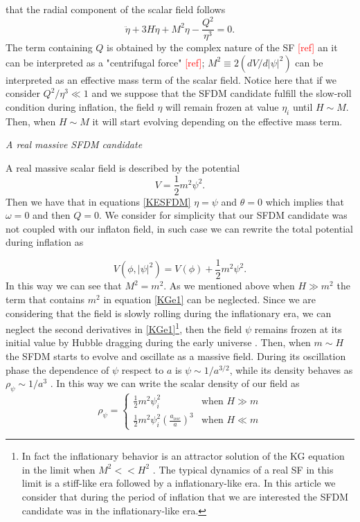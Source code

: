\documentclass[amssymb,twocolumn,prd,nofootinbib,showpacs]{revtex4-1}
\begin{document}
that the radial component of the scalar field follows
\begin{equation}\label{KGe3}
\ddot\eta+3H\dot\eta+M^2\eta-\frac{Q^2}{\eta^3}= 0.
\end{equation}
The term containing $Q$ is obtained by the complex nature of the SF \textcolor{red}{[ref]} an it can be interpreted as a "centrifugal force" \textcolor{red}{[ref]}; $M^2\equiv 2(dV/d|\psi|^2)$ can be interpreted as an effective mass term of the scalar field. Notice here that if we consider $Q^2/\eta^3\ll 1$ and we suppose that the SFDM candidate fulfill the slow-roll condition during inflation, the field $\eta$ will remain frozen at value $\eta_i$ until $H\sim M$. Then, when $H\sim M$ it will start evolving depending on the effective mass term.
\begin{center}
\textit{A real massive SFDM candidate}
\end{center}

A real massive scalar field is described by the potential 
\begin{equation}
V = \frac{1}{2}m^2\psi^2.
\end{equation}
Then we have that in equations \eqref{KESFDM} $\eta=\psi$ and $\theta=0$ which implies that $\omega=0$ and then $Q = 0$. We consider for simplicity that our SFDM candidate was not coupled with our inflaton field, in such case we can rewrite the total potential during inflation as

\begin{equation}\label{potential_massive}
V(\phi,|\psi|^2)=V(\phi)+\frac{1}{2}m^2\psi^2.
\end{equation}
In this way we can see that $M^2=m^2$. As we mentioned above when $H\gg m^2$ the term that contains $m^2$ in equation \eqref{KGe1} can be neglected. Since we are considering that the field is slowly rolling during the inflationary era, we can neglect the second derivatives in \eqref{KGe1}\footnote{In fact the inflationary behavior is an attractor solution of the KG equation in the limit when $M^2<<H^2$ \cite{atractorinf1,atractorinf2}. The typical dynamics of a real SF in this limit is a stiff-like era followed by a inflationary-like era. In this article we consider that during the period of inflation that we are interested the SFDM candidate was in the inflationary-like era.}, then the field $\psi$ remains frozen at its initial value by Hubble dragging during the early universe \cite{curvatonatractor}. Then, when $m\sim H$ the SFDM starts to evolve and oscillate as a massive field. During its oscillation phase the dependence of $\psi$ respect to $a$ is $\psi\sim 1/a^{3/2}$, while its density behaves as $\rho_{\psi}\sim 1/a^3$  \cite{SFphi41,SFphi42}. In this way we can write the scalar density of our field as
\begin{equation}\label{rhosfdm}
\rho_\psi = \left\lbrace\begin{array}{ll}
\frac{1}{2}m^2\psi_i^2 & \text{when }H\gg m \\
\frac{1}{2}m^2\psi_i^2\left(\frac{a_{osc}}{a}\right)^3 & \text{when }H\ll m
\end{array}\right .
\end{equation}
\end{document}
